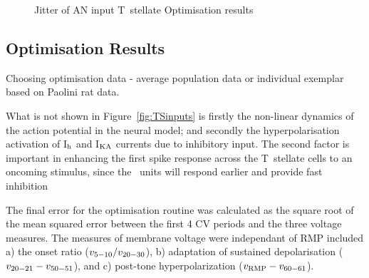 \begin{figure}[htb]
  \centering
  \caption[]{Jitter of AN input T~stellate Optimisation results}
  \label{fig:CSjitter}
\end{figure}




\clearpage
\subsection{Optimisation Results}

Choosing optimisation data - average population data or individual exemplar
based on Paolini rat data.


What is not shown in Figure~\ref{fig:TSinputs} is firstly the non-linear
dynamics of the action potential in the neural model; and secondly the
hyperpolarisation activation of I$_{\rm h}$ and I$_{\rm KA}$ currents due
to inhibitory input.  The second factor is important in enhancing the first
spike response across the T~stellate cells \citep{PaoliniClareyEtAl:2004}to
an oncoming stimulus, since the \OnC~units will respond earlier and provide
fast inhibition


The final error for the optimisation routine was calculated as the square
root of the mean squared error between the first 4 CV periods and the three
voltage measures. The measures of membrane voltage were independant of RMP
included a) the onset ratio ($v_{\rm 5-10}/v_{\rm 20-30}$), b) adaptation
of sustained depolarisation ($v_{\rm 20-21} - v_{\rm 50-51}$), and c)
post-tone hyperpolarization ($v_{\rm RMP} - v_{\rm 60-61}$).


